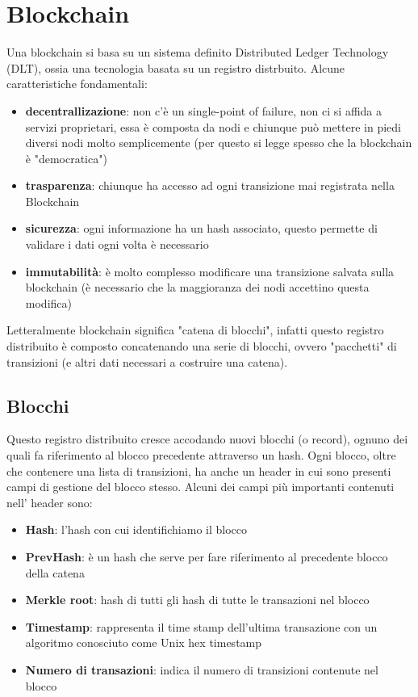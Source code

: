 \section{Blockchain}
Una blockchain si basa su un sistema definito Distributed Ledger Technology (DLT), ossia una tecnologia basata su un registro distrbuito. Alcune caratteristiche fondamentali:
\begin{itemize}
    \item {\bfseries decentrallizazione}: non c'è un single-point of failure, non ci si affida a servizi proprietari, essa è composta da nodi e chiunque può mettere in piedi diversi nodi molto semplicemente (per questo si legge spesso che la blockchain è "democratica")
    \item {\bfseries trasparenza}: chiunque ha accesso ad ogni transizione mai registrata nella Blockchain
    \item {\bfseries sicurezza}: ogni informazione ha un hash associato, questo permette di validare i dati ogni volta è necessario
	\item {\bfseries immutabilità}: è molto complesso modificare una transizione salvata sulla blockchain (è necessario che la maggioranza dei nodi accettino questa modifica)
\end{itemize}

Letteralmente blockchain significa "catena di blocchi", infatti questo registro distribuito è composto concatenando una serie di blocchi, ovvero "pacchetti" di transizioni (e altri dati necessari a costruire una catena).

\subsection{Blocchi}
Questo registro distribuito cresce accodando nuovi blocchi (o record), ognuno dei quali fa riferimento al blocco precedente attraverso un hash.
Ogni blocco, oltre che contenere una lista di transizioni, ha anche un header in cui sono presenti campi di gestione del blocco stesso.
Alcuni dei campi più importanti contenuti nell' header sono:
\begin{itemize}
    \item {\bfseries Hash}: l'hash con cui identifichiamo il blocco
	\item {\bfseries PrevHash}: è un hash che serve per fare riferimento al precedente blocco della catena
	\item {\bfseries Merkle root}: hash di tutti gli hash di tutte le transazioni nel blocco
	\item {\bfseries Timestamp}: rappresenta il time stamp dell'ultima transazione con un algoritmo conosciuto come Unix hex timestamp
	\item {\bfseries Numero di transazioni}: indica il numero di transizioni contenute nel blocco
\end{itemize}

